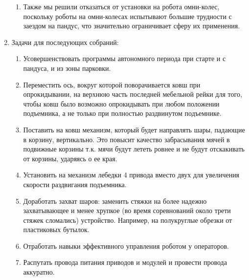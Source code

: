\begin{enumerate}
\begin{enumerate}
  	\item Также мы решили отказаться от установки на робота омни-колес, поскольку роботы на омни-колесах испытывают большие трудности с заездом на пандус, что значительно ограничивает сферу их применения.
  	
  \end{enumerate}
  
  \item Задачи для последующих собраний:
  \begin{enumerate}
  	\item Усовершенствовать программы автономного периода при старте и с пандуса, и из зоны парковки.
  	
  	\item Переместить ось, вокруг которой поворачивается ковш при опрокидывании, на верхнюю часть последней мебельной рейки для того, чтобы ковш было возможно опрокидывать при любом положении подъемника, а не только при полностью раздвинутом подъемнике.
  	
  	\item Поставить на ковш механизм, который будет направлять шары, падающие в корзину, вертикально. Это повысит качество забрасывания мячей в подвижные корзины т.к. мячи будут лететь ровнее и не будут отскакивать от корзины, ударяясь о ее края.
  	
  	\item Установить на механизм лебедки 4 привода вместо двух для увеличения скорости раздвигания подъемника.
  	
  	\item Доработать захват шаров: заменить стяжки на более надежно захватывающее и менее хрупкое (во время соревнований около трети стяжек сломались) устройство. Например, на полукруглые обрезки от пластиковых бутылок.
  	
  	\item Отработать навыки эффективного управления роботом у операторов.
  	
  	\item Распутать провода питания приводов и модулей и провести провода аккуратно.
  	
  \end{enumerate}
  
\end{enumerate}
\fillpage